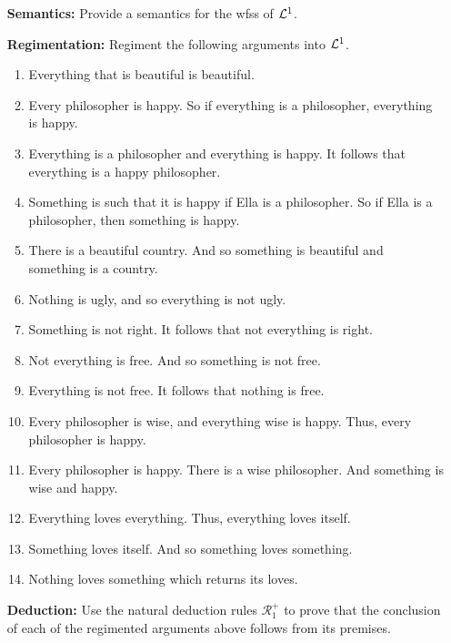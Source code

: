 \documentclass[a4paper, 11pt]{article} %
\begin{document}
\begin{enumerate}[leftmargin=1.2in]
	\item[\bf Semantics:] Provide a semantics for the wfss of $\mathcal{L}^1$.
	\item[\bf Regimentation:] Regiment the following arguments into $\mathcal{L}^1$.
	      \begin{enumerate}[label=(\arabic*)]\small
		      \item Everything that is beautiful is beautiful.
		      \item Every philosopher is happy. So if everything is a philosopher, everything is happy.
		      \item Everything is a philosopher and everything is happy. It follows that everything is a happy philosopher.
		      \item Something is such that it is happy if Ella is a philosopher. So if Ella is a philosopher, then something is happy.
		      \item There is a beautiful country. And so something is beautiful and something is a country.
		      \item Nothing is ugly, and so everything is not ugly.
		      \item Something is not right. It follows that not everything is right.
		      \item Not everything is free. And so something is not free.
		      \item Everything is not free. It follows that nothing is free.
		      \item Every philosopher is wise, and everything wise is happy. Thus, every philosopher is happy.
		      \item Every philosopher is happy. There is a wise philosopher. And something is wise and happy.
		      \item Everything loves everything. Thus, everything loves itself.
		      \item Something loves itself. And so something loves something.
		      \item Nothing loves something which returns its loves.
	      \end{enumerate}
	\item[\bf Deduction:] Use the natural deduction rules $\mathcal{R}_1^+$ to prove that the conclusion of each of the regimented arguments above follows from its premises.

\end{enumerate}
\end{document}
